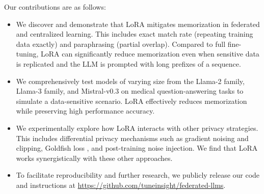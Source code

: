 Our contributions are as follows:
\begin{itemize}
    \item We discover and demonstrate that LoRA mitigates memorization in federated and centralized learning. This includes exact match rate (repeating training data exactly) and paraphrasing (partial overlap). Compared to full fine-tuning, LoRA can significantly reduce memorization even when sensitive data is replicated and the LLM is prompted with long prefixes of a sequence. 
    \item We comprehensively test models of varying size from the Llama-2 family, Llama-3 family, and Mistral-v0.3 on medical question-answering tasks to simulate a data-sensitive scenario. LoRA effectively reduces memorization while preserving high performance accuracy. 
    \item We experimentally explore how LoRA interacts with other privacy strategies. This includes differential privacy mechanisms such as gradient noising and clipping, Goldfish loss \citep{hans2024goldfish}, and post-training noise injection. We find that LoRA works synergistically with these other approaches.
    \item To facilitate reproducibility and further research, we publicly release our code and instructions at \url{https://github.com/tuneinsight/federated-llms}.
\end{itemize}